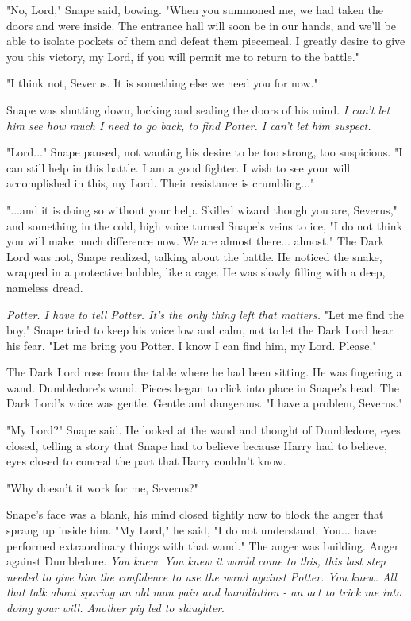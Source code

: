\documentclass[a4paper,11pt]{article}
\begin{document}
"No, Lord," Snape said, bowing. "When you summoned me, we had taken the doors and were inside. The entrance hall will soon be in our hands, and we'll be able to isolate pockets of them and defeat them piecemeal. I greatly desire to give you this victory, my Lord, if you will permit me to return to the battle."

"I think not, Severus. It is something else we need you for now."

Snape was shutting down, locking and sealing the doors of his mind. \emph{I can't let him see how much I need to go back, to find Potter. I can't let him suspect.}

"Lord..." Snape paused, not wanting his desire to be too strong, too suspicious. "I can still help in this battle. I am a good fighter. I wish to see your will accomplished in this, my Lord. Their resistance is crumbling..."

"...and it is doing so without your help. Skilled wizard though you are, Severus," and something in the cold, high voice turned Snape's veins to ice, "I do not think you will make much difference now. We are almost there... almost." The Dark Lord was not, Snape realized, talking about the battle. He noticed the snake, wrapped in a protective bubble, like a cage. He was slowly filling with a deep, nameless dread.

\emph{Potter. I have to tell Potter. It's the only thing left that matters.} "Let me find the boy," Snape tried to keep his voice low and calm, not to let the Dark Lord hear his fear. "Let me bring you Potter. I know I can find him, my Lord. Please."

The Dark Lord rose from the table where he had been sitting. He was fingering a wand. Dumbledore's wand. Pieces began to click into place in Snape's head. The Dark Lord's voice was gentle. Gentle and dangerous. "I have a problem, Severus."

"My Lord?" Snape said. He looked at the wand and thought of Dumbledore, eyes closed, telling a story that Snape had to believe because Harry had to believe, eyes closed to conceal the part that Harry couldn't know.

"Why doesn't it work for me, Severus?"

Snape's face was a blank, his mind closed tightly now to block the anger that sprang up inside him. "My Lord," he said, "I do not understand. You... have performed extraordinary things with that wand." The anger was building. Anger against Dumbledore. \emph{You knew. You knew it would come to this, this last step needed to give him the confidence to use the wand against Potter. You knew. All that talk about sparing an old man pain and humiliation - an act to trick me into doing your will. Another pig led to slaughter}.
\end{document}
